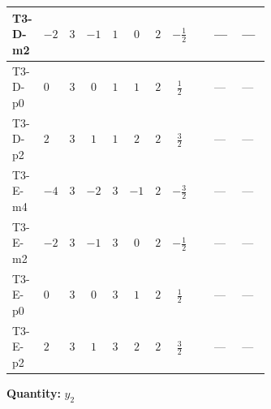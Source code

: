 \documentclass[8pt]{article}
\begin{document}
\begin{landscape}
\begin{longtable}{@{}llcccccc >{\raggedright\arraybackslash}p{0.21\linewidth} >{\raggedright\arraybackslash}p{0.21\linewidth} >{\raggedright\arraybackslash}p{0.21\linewidth}@{}}
\midrule
T3-D-m2 & $-2$ & $3$ & $-1$ & $1$ & $0$ & $2$ & $-\frac{1}{2}$ & \scriptsize\adjustbox{max width=\linewidth}{$\begin{gathered} -\frac{3}{2} {g_1}^2 \left({y_2}\right)_{ij}\end{gathered}$} & --- & --- \\
\midrule
T3-D-p0 & $0$ & $3$ & $0$ & $1$ & $1$ & $2$ & $\frac{1}{2}$ & \scriptsize\adjustbox{max width=\linewidth}{$\begin{gathered} -\frac{3}{2} {g_1}^2 \left({y_2}\right)_{ij}\end{gathered}$} & --- & --- \\
\midrule
T3-D-p2 & $2$ & $3$ & $1$ & $1$ & $2$ & $2$ & $\frac{3}{2}$ & \scriptsize\adjustbox{max width=\linewidth}{$\begin{gathered} -\frac{15}{2} {g_1}^2 \left({y_2}\right)_{ij}\end{gathered}$} & --- & --- \\
\midrule
T3-E-m4 & $-4$ & $3$ & $-2$ & $3$ & $-1$ & $2$ & $-\frac{3}{2}$ & \scriptsize\adjustbox{max width=\linewidth}{$\begin{gathered} -\frac{15}{2} {g_1}^2 \left({y_2}\right)_{ij}\end{gathered}$} & --- & --- \\
\midrule
T3-E-m2 & $-2$ & $3$ & $-1$ & $3$ & $0$ & $2$ & $-\frac{1}{2}$ & \scriptsize\adjustbox{max width=\linewidth}{$\begin{gathered} -\frac{3}{2} {g_1}^2 \left({y_2}\right)_{ij}\end{gathered}$} & --- & --- \\
\midrule
T3-E-p0 & $0$ & $3$ & $0$ & $3$ & $1$ & $2$ & $\frac{1}{2}$ & \scriptsize\adjustbox{max width=\linewidth}{$\begin{gathered} -\frac{3}{2} {g_1}^2 \left({y_2}\right)_{ij}\end{gathered}$} & --- & --- \\
\midrule
T3-E-p2 & $2$ & $3$ & $1$ & $3$ & $2$ & $2$ & $\frac{3}{2}$ & \scriptsize\adjustbox{max width=\linewidth}{$\begin{gathered} -\frac{15}{2} {g_1}^2 \left({y_2}\right)_{ij}\end{gathered}$} & --- & --- \\
\midrule
\bottomrule
\end{longtable}
\clearpage
\noindent\textbf{Quantity: }$y_2$\par\smallskip

\end{landscape}
\end{document}
